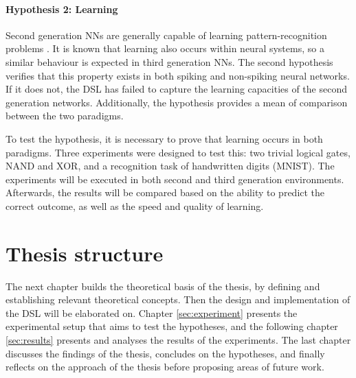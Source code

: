 \paragraph{Hypothesis 2: Learning}
Second generation \gls{NN}s are generally capable of learning pattern-recognition
problems \cite{Russel2007}.
It is known that learning also occurs within neural systems, so a
similar behaviour is expected in third generation \gls{NN}s.
The second hypothesis verifies that this property exists in both spiking and
non-spiking neural networks.
If it does not, the \gls{DSL} has failed to capture
the learning capacities of the second generation networks.
Additionally, the hypothesis provides a mean of comparison between the two paradigms.

To test the hypothesis, it is necessary to prove that learning occurs
in both paradigms.
Three experiments were designed to test this: two trivial
logical gates, NAND and XOR, and a recognition task of handwritten digits
(MNIST).
The experiments will be executed in both second and third generation
environments.
Afterwards, the results will be compared based on the ability to predict the correct outcome,
as well as the speed and quality of learning.

\section{Thesis structure}
The next chapter builds the theoretical basis of the thesis, by defining and
establishing relevant theoretical concepts.
Then the design and implementation of the \gls{DSL} will be elaborated on.
Chapter \ref{sec:experiment} presents the experimental setup that aims to
test the hypotheses, and the following chapter \ref{sec:results} presents and
analyses the results of the experiments.
The last chapter discusses the findings of the thesis, concludes on the
hypotheses, and finally reflects on the approach of the thesis before proposing
areas of future work.


